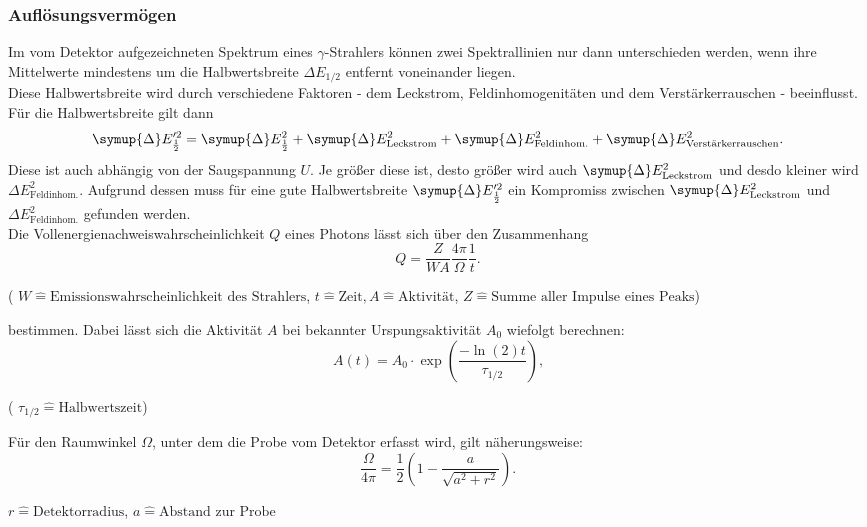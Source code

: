 \subsubsection{Auflösungsvermögen}
Im vom Detektor aufgezeichneten Spektrum eines $\gamma$-Strahlers können zwei Spektrallinien
nur dann unterschieden werden, wenn ihre Mittelwerte mindestens um die Halbwertsbreite
$\Delta E_{1/2}$ entfernt voneinander liegen. \\
Diese Halbwertsbreite wird durch verschiedene Faktoren - dem Leckstrom, Feldinhomogenitäten und dem Verstärkerrauschen - beeinflusst. Für die Halbwertsbreite gilt dann
\begin{equation}
    \symup{\Delta}E'^2_{\frac{1}{2}} = \symup{\Delta}E^2_{\frac{1}{2}} + \symup{\Delta}E^2_\text{Leckstrom} + \symup{\Delta}E^2_\text{Feldinhom.} + \symup{\Delta}E^2_\text{Verstärkerrauschen}.
\end{equation}
Diese ist auch abhängig von der Saugspannung $U$. Je größer diese ist, desto größer wird auch $\symup{\Delta}E^2_\text{Leckstrom}$ und desdo kleiner wird ${\Delta}E^2_\text{Feldinhom.}$. Aufgrund dessen muss für eine gute Halbwertsbreite $\symup{\Delta}E'^2_{\frac{1}{2}}$ ein Kompromiss zwischen $\symup{\Delta}E^2_\text{Leckstrom}$ und ${\Delta}E^2_\text{Feldinhom.}$ gefunden werden. \\
Die Vollenergienachweiswahrscheinlichkeit $Q$ eines Photons lässt sich über den Zusammenhang 
\begin{equation}
Q=\frac{Z}{W A}\frac{4\pi}{\Omega}\frac{1}{t}\text{.}\label{eqn:efficiency}
\end{equation}
\begin{center}
    \tiny{( $W \hat{=} \text{Emissionswahrscheinlichkeit des Strahlers} $, $t \hat{=} \text{Zeit}, A \hat{=} \text{Aktivität} $, $Z \hat{=} \text{Summe aller Impulse eines Peaks}$)}
\end{center}
bestimmen.
Dabei lässt sich die Aktivität $A$ bei bekannter Urspungsaktivität $A_0$ wiefolgt berechnen:
\begin{equation}
A(t) = A_0\cdot \exp\left(\frac{-\ln(2)t}{\tau_{1/2}}\right)\text{,}\label{eqn:A} 
\end{equation}
\begin{center}
    \tiny{( $\tau_{1/2} \hat{=} \text{Halbwertszeit}  $)}
\end{center}
Für den Raumwinkel $\Omega$, unter dem die Probe vom Detektor erfasst wird, gilt näherungsweise:
\begin{equation}
\frac{\Omega}{4\pi} = \frac{1}{2}\left(1-\frac{a}{\sqrt{a^2+r^2}}\right)\text{.}\label{eqn:Omega}
\end{equation}
\begin{center}
    \tiny{$r \hat{=} \text{Detektorradius}$, $a \hat{=} \text{Abstand zur Probe}$}
\end{center}

